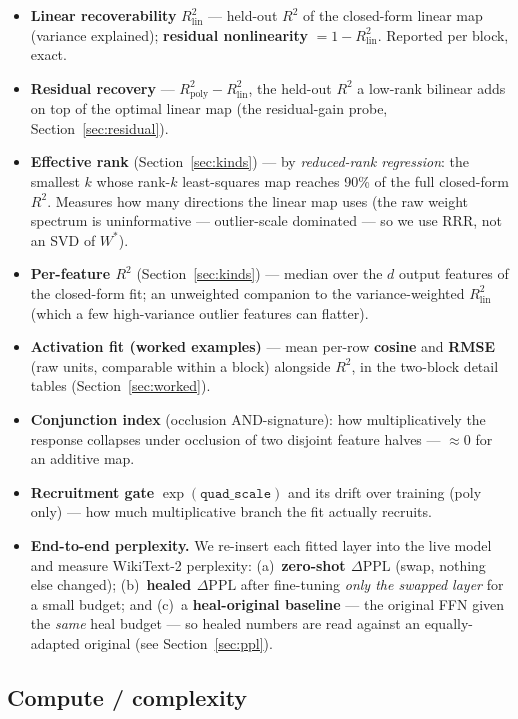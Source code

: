 \documentclass{article}
\newcommand{\Rlin}{R^2_{\mathrm{lin}}}
\newcommand{\Rpoly}{R^2_{\mathrm{poly}}}
\newcommand{\dppl}{\Delta\mathrm{PPL}}
\begin{document}
\begin{itemize}
\item \textbf{Linear recoverability} $\Rlin$ --- held-out $R^2$ of the closed-form linear map
  (variance explained); \textbf{residual nonlinearity} $= 1-\Rlin$. Reported per block, exact.
\item \textbf{Residual recovery} --- $\Rpoly - \Rlin$, the held-out $R^2$ a low-rank
  bilinear adds on top of the optimal linear map (the residual-gain probe,
  Section~\ref{sec:residual}).
\item \textbf{Effective rank} (Section~\ref{sec:kinds}) --- by \emph{reduced-rank regression}:
  the smallest $k$ whose rank-$k$ least-squares map reaches 90\% of the full closed-form $R^2$.
  Measures how many directions the linear map uses (the raw weight spectrum is uninformative
  --- outlier-scale dominated --- so we use RRR, not an SVD of $W^{*}$).
\item \textbf{Per-feature $R^2$} (Section~\ref{sec:kinds}) --- median over the $d$ output
  features of the closed-form fit; an unweighted companion to the variance-weighted $\Rlin$
  (which a few high-variance outlier features can flatter).
\item \textbf{Activation fit (worked examples)} --- mean per-row \textbf{cosine} and
  \textbf{RMSE} (raw units, comparable within a block) alongside $R^2$, in the two-block
  detail tables (Section~\ref{sec:worked}).
\item \textbf{Conjunction index} (occlusion AND-signature): how multiplicatively the response
  collapses under occlusion of two disjoint feature halves --- $\approx 0$ for an additive map.
\item \textbf{Recruitment gate} $\exp(\texttt{quad\_scale})$ and its drift over training
  (poly only) --- how much multiplicative branch the fit actually recruits.
\item \textbf{End-to-end perplexity.} We re-insert each fitted layer into the live model and
  measure WikiText-2 perplexity: (a)~\textbf{zero-shot $\dppl$} (swap, nothing else changed);
  (b)~\textbf{healed $\dppl$} after fine-tuning \emph{only the swapped layer} for a small
  budget; and (c)~a \textbf{heal-original baseline} --- the original FFN given the \emph{same}
  heal budget --- so healed numbers are read against an equally-adapted original (see
  Section~\ref{sec:ppl}).
\end{itemize}

\subsection{Compute / complexity}
\label{sec:compute}
\end{document}
